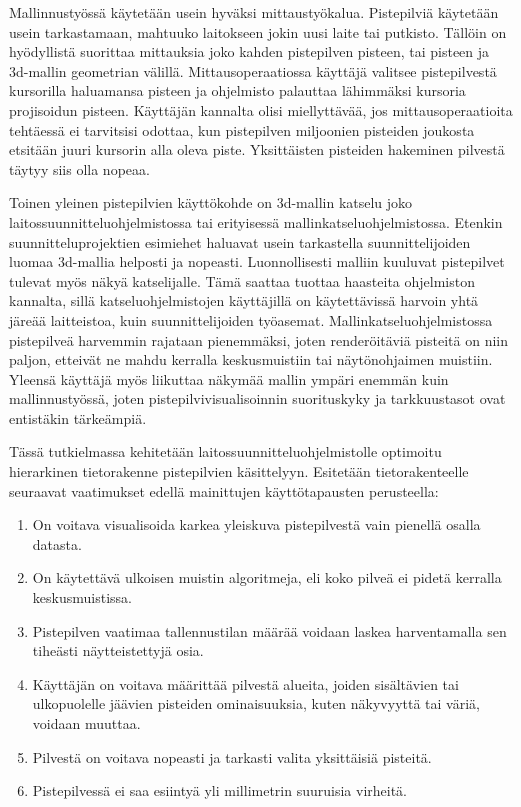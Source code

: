 Mallinnustyössä käytetään usein hyväksi mittaustyökalua. Pistepilviä käytetään usein tarkastamaan, mahtuuko laitokseen jokin uusi laite tai putkisto. Tällöin on hyödyllistä suorittaa mittauksia joko kahden pistepilven pisteen, tai pisteen ja 3d-mallin geometrian välillä. Mittausoperaatiossa käyttäjä valitsee pistepilvestä kursorilla haluamansa pisteen ja ohjelmisto palauttaa lähimmäksi kursoria projisoidun pisteen. Käyttäjän kannalta olisi miellyttävää, jos mittausoperaatioita tehtäessä ei tarvitsisi odottaa, kun pistepilven miljoonien pisteiden joukosta etsitään juuri kursorin alla oleva piste. Yksittäisten pisteiden hakeminen pilvestä täytyy siis olla nopeaa.

Toinen yleinen pistepilvien käyttökohde on 3d-mallin katselu joko laitossuunnitteluohjelmistossa tai erityisessä mallinkatseluohjelmistossa. Etenkin suunnitteluprojektien esimiehet haluavat usein tarkastella suunnittelijoiden luomaa 3d-mallia helposti ja nopeasti. Luonnollisesti malliin kuuluvat pistepilvet tulevat myös näkyä katselijalle. Tämä saattaa tuottaa haasteita ohjelmiston kannalta, sillä katseluohjelmistojen käyttäjillä on käytettävissä harvoin yhtä järeää laitteistoa, kuin suunnittelijoiden työasemat. Mallinkatseluohjelmistossa pistepilveä harvemmin rajataan pienemmäksi, joten renderöitäviä pisteitä on niin paljon, etteivät ne mahdu kerralla keskusmuistiin tai näytönohjaimen muistiin. Yleensä käyttäjä myös liikuttaa näkymää mallin ympäri enemmän kuin mallinnustyössä, joten pistepilvivisualisoinnin suorituskyky ja tarkkuustasot ovat entistäkin tärkeämpiä.

Tässä tutkielmassa kehitetään laitossuunnitteluohjelmistolle optimoitu hierarkinen tietorakenne pistepilvien käsittelyyn. Esitetään tietorakenteelle seuraavat vaatimukset edellä mainittujen käyttötapausten perusteella:
\begin{enumerate}
    \item \label{vaatimus:lod} On voitava visualisoida karkea yleiskuva pistepilvestä vain pienellä osalla datasta. 
    \item \label{vaatimus:ooc} On käytettävä ulkoisen muistin algoritmeja, eli koko pilveä ei pidetä kerralla keskusmuistissa.
    \item \label{vaatimus:harvennus} Pistepilven vaatimaa tallennustilan määrää voidaan laskea harventamalla sen tiheästi näytteistettyjä osia. 
    \item \label{vaatimus:crop} Käyttäjän on voitava määrittää pilvestä alueita, joiden sisältävien tai ulkopuolelle jäävien pisteiden ominaisuuksia, kuten näkyvyyttä tai väriä, voidaan muuttaa.
    \item \label{vaatimus:select} Pilvestä on voitava nopeasti ja tarkasti valita yksittäisiä pisteitä.
    \item \label{vaatimus:virhe} Pistepilvessä ei saa esiintyä yli millimetrin suuruisia virheitä.
\end{enumerate}